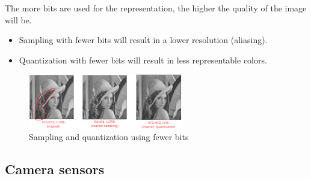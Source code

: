 \begin{remark}
    The more bits are used for the representation, the higher the quality of the image will be.
    \begin{itemize}
        \item Sampling with fewer bits will result in a lower resolution (aliasing).
        \item Quantization with fewer bits will result in less representable colors.
    \end{itemize}
    \begin{figure}[H]
        \centering
        \includegraphics[width=0.6\textwidth]{./img/_digitalization_quality.pdf}
        \caption{Sampling and quantization using fewer bits}
    \end{figure}
\end{remark}


\subsection{Camera sensors}

